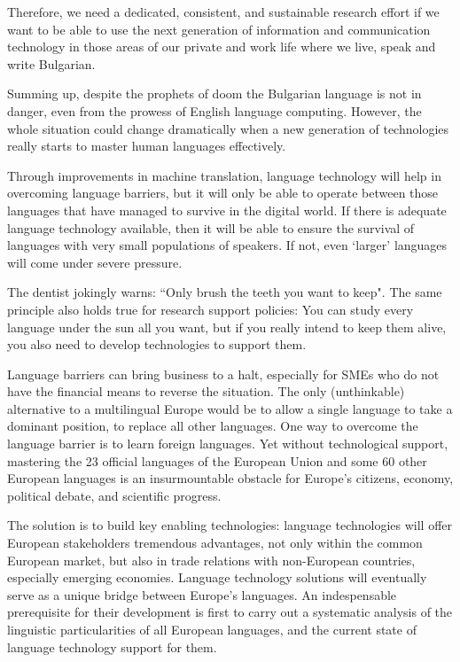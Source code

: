 \begin{multicols}{2}
Therefore, we need a dedicated, consistent, and sustainable research effort if we want to be able to use the next generation of information and communication technology in those areas of our private and work life where we live, speak and write Bulgarian.

Summing up, despite the prophets of doom the Bulgarian language is not in danger, even from the prowess of English language computing. However, the whole situation could change dramatically when a new generation of technologies really starts to master human languages effectively. 

Through improvements in machine translation, language technology will help in overcoming language barriers, but it will only be able to operate between those languages that have managed to survive in the digital world. If there is adequate language technology available, then it will be able to ensure the survival of languages with very small populations of speakers. If not, even ‘larger’ languages will come under severe pressure. 


The dentist jokingly warns: ``Only brush the teeth you want to keep". The same principle also holds true for research support policies: You can study every language under the sun all you want, but if you really intend to keep them alive, you also need to develop technologies to support them.


  Language barriers can bring business to a halt, especially for SMEs who do not have the financial means to reverse the situation. The only (unthinkable) alternative to a multilingual Europe would be to allow a single language to take a dominant position, to replace all other languages. One way to overcome the language barrier is to learn foreign languages. Yet without technological support, mastering the 23 official languages of the European Union and some 60 other European languages is an insurmountable obstacle for Europe’s citizens, economy, political debate, and scientific progress.

  The solution is to build key enabling technologies: language technologies will offer European stakeholders tremendous advantages, not only within the common European market, but also in trade relations with non-European countries, especially emerging economies. Language technology solutions will eventually serve as a unique bridge between Europe's languages. An indespensable prerequisite for their development is first to carry out a systematic analysis of the linguistic particularities of all European languages, and the current state of language technology support for them.  


\end{multicols}

